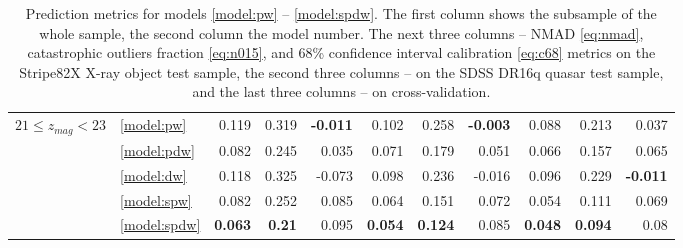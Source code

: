 \documentclass[fleqn,usenatbib]{mnras}
\begin{document}
\begin{table}
\begin{tabular}{llrrrrrrrrr}
\hline
            $21 \leq z_{mag} < 23$ & \ref{model:pw} &                0.119 &           0.319 &  \textbf{-0.011} &            0.102 &           0.258 &  \textbf{-0.003} &            0.088 &           0.213 &            0.037 \\
                                   & \ref{model:pdw} &                0.082 &           0.245 &            0.035 &            0.071 &           0.179 &            0.051 &            0.066 &           0.157 &            0.065 \\
                                   & \ref{model:dw} &                0.118 &           0.325 &           -0.073 &            0.098 &           0.236 &           -0.016 &            0.096 &           0.229 &  \textbf{-0.011} \\
                                   & \ref{model:spw} &                0.082 &           0.252 &            0.085 &            0.064 &           0.151 &            0.072 &            0.054 &           0.111 &            0.069 \\
                                   & \ref{model:spdw} &       \textbf{0.063} &   \textbf{0.21} &            0.095 &   \textbf{0.054} &  \textbf{0.124} &            0.085 &   \textbf{0.048} &  \textbf{0.094} &             0.08 \\
\hline
            \hline
            \end{tabular}
            \caption{Prediction metrics for models \ref{model:pw} -- \ref{model:spdw}. The first column shows the subsample of the whole sample, the second column the model number. The next three columns -- NMAD \eqref{eq:nmad}, catastrophic outliers fraction \eqref{eq:n015}, and 68\% confidence interval calibration \eqref{eq:c68} metrics on the Stripe82X X-ray object test sample, the second three columns -- on the SDSS DR16q quasar test sample, and the last three columns -- on cross-validation.}
\end{table}
\end{document}
